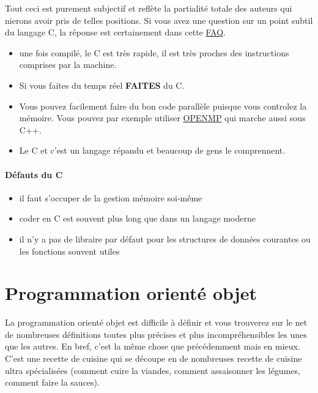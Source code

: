 Tout ceci est purement subjectif et reflète la partialité totale des auteurs qui nierons
 avoir pris de telles positions.
 Si vous avez une question sur un point subtil du langage C, la réponse est certainement dans cette 
 \href{http://c-faq.com/}{FAQ}.
 
 
 
\begin{itemize}
\item une fois compilé, le C est très rapide, il est très proches des instructions comprises par la machine. 
\item Si vous faites du temps réel \textbf{FAITES} du C.
\item Vous pouvez facilement faire du bon code parallèle puisque vous controlez la mémoire.
Vous pouvez par exemple utiliser \href{http://openmp.org/}{OPENMP} qui marche aussi sous C++.
\item Le C et c'est un langage répandu et beaucoup de gens le comprennent.
\end{itemize}

\paragraph{Défauts du C}

\begin{itemize}
\item il faut s'occuper de la gestion mémoire soi-même
\item coder en C est souvent plus long que dans un langage moderne
\item il n'y a pas de libraire par défaut pour les structures de données courantes ou les fonctions souvent utiles
\end{itemize}

\section{Programmation orienté objet}

La programmation orienté objet est difficile à définir et vous trouverez sur le net de nombreuses 
définitions toutes plus précises et plus incompréhensibles les unes que les autres.
 En bref, c'est la même chose que précédemment mais en mieux. C'est une recette de cuisine qui se 
découpe en de nombreuses recette de cuisine ultra spécialisées (comment cuire la viandes,
 comment assaisonner les légumes, comment faire la sauces).\\

